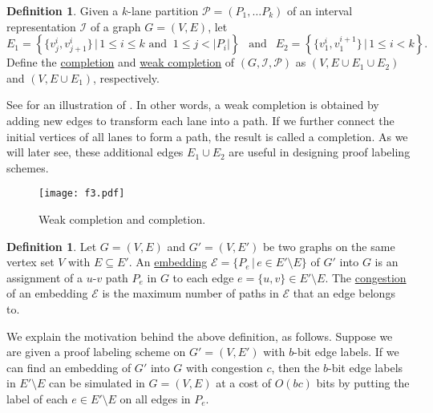\documentclass[11pt]{article}
\theoremstyle{definition}
\newtheorem{definition}[lemma]{Definition}
\theoremstyle{remark}
\begin{document}
 

\begin{definition}\label{def:completion}
Given a {$k$-lane partition}  $\mathcal{P}=(P_1, \ldots P_k)$  of an interval representation $\mathcal{I}$ of a graph $G=(V,E)$, let
\[E_1 = \left\{ \{v_j^i, v_{j+1}^{i}\} \, | \, 1 \leq i \leq k \text{ and } \ 1 \leq j < |P_i| \right\} \ \ \text{ and } \  \  E_2= \left\{ \{v_1^i, v_{1}^{i+1}\} \, | \, 1 \leq i < k \right\}.\]
Define the \ul{completion} and \ul{weak completion} of $(G,\mathcal{I},\mathcal{P})$ as $(V,E \cup E_1 \cup E_2)$ and $(V,E \cup E_1)$, respectively.
\end{definition}

See  for an illustration of . In other words, a weak completion is obtained by adding new edges to transform each lane into a path. If we further connect the initial vertices of all lanes to form a path, the result is called a completion. As we will later see, these additional edges $E_1 \cup E_2$ are useful in designing proof labeling schemes.
 
\begin{figure}[ht!]
    \centering
    \texttt{[image: f3.pdf]}
    \caption{Weak completion and completion.}
    \label{fig:f3}
\end{figure}

\begin{definition}
Let $G=(V,E)$ and $G'=(V, E')$ be two graphs on the same vertex set $V$ with $E \subseteq E'$. An \ul{embedding} $\mathcal{E}=\{ P_e \, | \, e\in E' \setminus E\}$ of $G'$ into $G$ is an assignment of a $u$-$v$ path $P_e$ in $G$ to each edge $e=\{u,v\} \in E' \setminus E$. The \ul{congestion} of an embedding $\mathcal{E}$ is the maximum number of paths in $\mathcal{E}$ that an edge belongs to.
\end{definition}

We explain the motivation behind the above definition, as follows.
Suppose we are given a proof labeling scheme on $G'=(V, E')$ with $b$-bit edge labels.
If we can find an embedding of $G'$ into $G$ with congestion $c$, then the $b$-bit edge labels in $E' \setminus E$ can be simulated in $G=(V,E)$ at a cost of $O(bc)$ bits by putting the label of each $e\in E' \setminus E$ on all edges in $P_e$.
\end{document}
